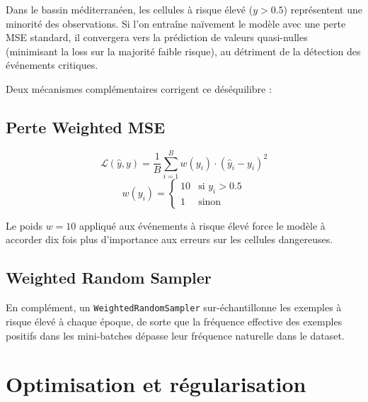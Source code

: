 \documentclass[12pt,a4paper]{report}
\begin{document}
Dans le bassin méditerranéen, les cellules à risque élevé ($y > 0.5$) représentent
une minorité des observations. Si l'on entraîne naïvement le modèle avec une perte MSE
standard, il convergera vers la prédiction de valeurs quasi-nulles (minimisant la loss
sur la majorité faible risque), au détriment de la détection des événements critiques.

Deux mécanismes complémentaires corrigent ce déséquilibre :

\subsection{Perte Weighted MSE}

\begin{equation}
  \mathcal{L}(\hat{y}, y) = \frac{1}{B} \sum_{i=1}^{B} w(y_i) \cdot (\hat{y}_i - y_i)^2
  \label{eq:wmse}
\end{equation}
\begin{equation}
  w(y_i) = \begin{cases} 10 & \text{si } y_i > 0.5 \\ 1 & \text{sinon} \end{cases}
\end{equation}

Le poids $w = 10$ appliqué aux événements à risque élevé force le modèle à accorder
dix fois plus d'importance aux erreurs sur les cellules dangereuses.

\subsection{Weighted Random Sampler}

En complément, un \texttt{WeightedRandomSampler} sur-échantillonne les exemples à
risque élevé à chaque époque, de sorte que la fréquence effective des exemples positifs
dans les mini-batches dépasse leur fréquence naturelle dans le dataset.

\section{Optimisation et régularisation}
\end{document}
